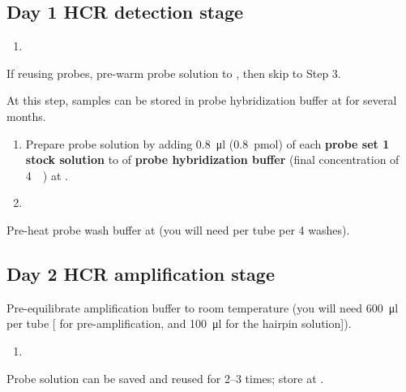 \documentclass[10pt]{report}
\begin{document}
\subsection*{Day 1 \textendash{} HCR detection stage}
\begin{enumerate}[series = steps]
	\item {}
\end{enumerate}

\bigskip\alert{If reusing probes, pre-warm probe solution to \thirtysevendegree, then skip to Step 3.}

\alert{At this step, samples can be stored in probe hybridization buffer at \minustwenty{} for several months.}

\begin{enumerate}[resume = steps]
	\item Prepare probe solution by adding \qty{0.8}{\ul} (\qty{0.8}{\pmol}) of each \textbf{probe set \qty{1}{\micro\molar} stock solution} to \twohunmicrol{} of \textbf{probe hybridization buffer} (final concentration of \qty{4}{\nano\molar}) at \thirtysevendegree.\\
	\item {}
\end{enumerate}


\bigskip\alert{Pre-heat probe wash buffer at \thirtysevendegree{} (you will need \fivehunmicrol{} per tube per 4 washes).}


\subsection*{Day 2 \textendash{} HCR amplification stage}

\alert{Pre-equilibrate amplification buffer to room temperature (you will need \qty{600}{\ul} per tube [\fivehunmicrol{} for pre-amplification, and \qty{100}{\ul} for the hairpin solution]).}
\begin{enumerate}[series = steps]
	\item {}
\end{enumerate}

\bigskip\alert{Probe solution can be saved and reused for 2--3 times; store at \minustwenty.}
\end{document}
